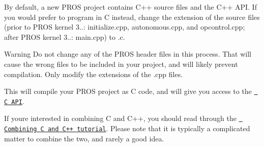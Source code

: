 By default, a new P\+R\+OS project contains C++ source files and the C++ A\+PI. If you would prefer to program in C instead, change the extension of the source files (prior to P\+R\+OS kernel 3..\+: {\ttfamily initialize.\+cpp}, {\ttfamily autonomous.\+cpp}, and {\ttfamily opcontrol.\+cpp}; after P\+R\+OS kernel 3..\+: {\ttfamily main.\+cpp}) to {\ttfamily .c}.

\begin{DoxyWarning}{Warning}
Do not change any of the P\+R\+OS header files in this process. That will cause the wrong files to be included in your project, and will likely prevent compilation. Only modify the extensions of the {\ttfamily .cpp} files.
\end{DoxyWarning}
This will compile your P\+R\+OS project as C code, and will give you access to the \href{../../api/c/index.html}{\texttt{ C A\+PI}}.

If you\textquotesingle{}re interested in combining C and C++, you should read through the \href{../general/combining-c-cpp.html}{\texttt{ Combining C and C++ tutorial}}. Please note that it is typically a complicated matter to combine the two, and rarely a good idea. 